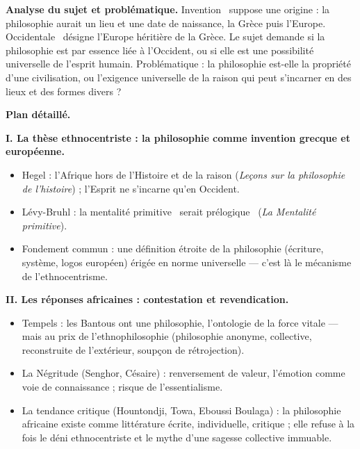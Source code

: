 \documentclass[11pt]{article}
\begin{document}
\begin{corrige}

\textbf{Analyse du sujet et problématique.} \guillemotleft Invention \guillemotright\ suppose une origine : la philosophie aurait un lieu et une date de naissance, la Grèce puis l'Europe. \guillemotleft Occidentale \guillemotright\ désigne l'Europe héritière de la Grèce. Le sujet demande si la philosophie est par essence liée à l'Occident, ou si elle est une possibilité universelle de l'esprit humain. Problématique : la philosophie est-elle la propriété d'une civilisation, ou l'exigence universelle de la raison qui peut s'incarner en des lieux et des formes divers ?

\textbf{Plan détaillé.}

\textbf{I. La thèse ethnocentriste : la philosophie comme invention grecque et européenne.}
\begin{itemize}
\item Hegel : l'Afrique hors de l'Histoire et de la raison (\emph{Leçons sur la philosophie de l'histoire}) ; l'Esprit ne s'incarne qu'en Occident.
\item Lévy-Bruhl : la mentalité \guillemotleft primitive \guillemotright\ serait \guillemotleft prélogique \guillemotright\ (\emph{La Mentalité primitive}).
\item Fondement commun : une définition étroite de la philosophie (écriture, système, logos européen) érigée en norme universelle — c'est là le mécanisme de l'ethnocentrisme.
\end{itemize}

\textbf{II. Les réponses africaines : contestation et revendication.}
\begin{itemize}
\item Tempels : les Bantous ont une philosophie, l'ontologie de la force vitale — mais au prix de l'ethnophilosophie (philosophie anonyme, collective, reconstruite de l'extérieur, soupçon de rétrojection).
\item La Négritude (Senghor, Césaire) : renversement de valeur, l'émotion comme voie de connaissance ; risque de l'essentialisme.
\item La tendance critique (Hountondji, Towa, Eboussi Boulaga) : la philosophie africaine existe comme littérature écrite, individuelle, critique ; elle refuse à la fois le déni ethnocentriste et le mythe d'une sagesse collective immuable.
\end{itemize}


\end{corrige}
\end{document}
